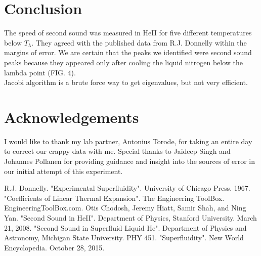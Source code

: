 \documentclass[prb,aps,twocolumn,showpacs,10pt]{revtex4-1}
\begin{document}
\section{Conclusion}
The speed of second sound was measured in HeII for five different temperatures below $T_\lambda$. They agreed with the published data from R.J. Donnelly within the margins of error. We are certain that the peaks we identified were second sound peaks because they appeared only after cooling the liquid nitrogen below the lambda point (FIG. 4). \\


Jacobi algorithm is a brute force way to get eigenvalues, but not very efficient.





\section{Acknowledgements}
I would like to thank my lab partner, Antonius Torode, for taking an entire day to correct our crappy data with me. Special thanks to Jaideep Singh and Johannes Pollanen for providing guidance and insight into the sources of error in our initial attempt of this experiment. 



\newpage
\begin{references}
 R.J. Donnelly. "Experimental Superfluidity". University of Chicago Press. 1967. 
 "Coefficients of Linear Thermal Expansion". The Engineering ToolBox. EngineeringToolBox.com. 
 Otis Chodosh, Jeremy Hiatt, Samir Shah, and Ning Yan. "Second Sound in HeII". Department of Physics, Stanford University. March 21, 2008.
 "Second Sound in Superfluid Liquid He". Department of Physics and Astronomy, Michigan State University. PHY 451.
 "Superfluidity". New World Encyclopedia. October 28, 2015. 
\end{references}
\end{document}
